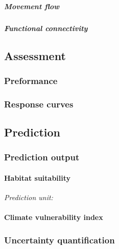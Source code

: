 \documentclass[11pt, a4paper]{article}
\begin{document}
\hypertarget{movement-flow}{%
\subparagraph{Movement flow}\label{movement-flow}}

\hypertarget{functional-connectivity}{%
\subparagraph{Functional connectivity}\label{functional-connectivity}}

\hypertarget{assessment}{%
\subsection{Assessment}\label{assessment}}

\hypertarget{preformance}{%
\subsubsection{Preformance}\label{preformance}}

\hypertarget{response-curves}{%
\subsubsection{Response curves}\label{response-curves}}

\hypertarget{prediction}{%
\subsection{Prediction}\label{prediction}}

\hypertarget{prediction-output}{%
\subsubsection{Prediction output}\label{prediction-output}}

\hypertarget{habitat-suitability}{%
\paragraph{Habitat suitability}\label{habitat-suitability}}

\emph{Prediction unit:}

\hypertarget{climate-vulnerability-index}{%
\paragraph{Climate vulnerability
index}\label{climate-vulnerability-index}}

\hypertarget{uncertainty-quantification}{%
\subsubsection{Uncertainty
quantification}\label{uncertainty-quantification}}
\end{document}
